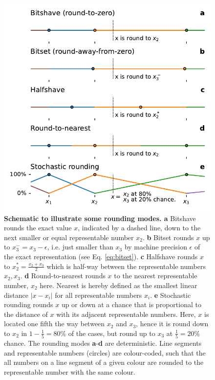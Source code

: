 \begin{figure}[tbhp]
	\includegraphics[width=1\textwidth]{Figures/methods/rounding_modes.pdf}
	\caption{\textbf{Schematic to illustrate some rounding modes. a}
	Bitshave rounds the exact value $x$, indicated by a dashed line, down to the next smaller or equal representable number $x_2$. \textbf{b}
	Bitset rounds $x$ up to $x_3^- = x_3-\epsilon$, i.e. just smaller than $x_3$ by machine precision $\epsilon$ of the exact representation
	(see Eq. \ref{eq:bitset}). \textbf{c} Halfshave rounds $x$ to $x_2^* = \tfrac{x_2 + x_3}{2}$ which is half-way between the representable
	numbers $x_2,x_3$. \textbf{d} Round-to-nearest rounds $x$ to the nearest representable number, $x_2$ here. Nearest is hereby defined
	as the smallest linear distance $\vert x - x_i \vert$ for all representable numbers $x_i$. \textbf{e} Stochastic rounding rounds $x$ up or
	down at a chance that is proportional to the distance of $x$ with its adjacent representable numbers. Here, $x$ is located one fifth the
	way between $x_2$ and $x_3$, hence it is round down to $x_2$ in $1-\tfrac{1}{5} = 80\%$ of the cases, but round up to $x_3$ at
	$\tfrac{1}{5} = 20\%$ chance. The rounding modes \textbf{a}-\textbf{d} are deterministic. Line segments and representable numbers
	(circles) are colour-coded, such that the all numbers on a line segment of a given colour are rounded to the representable number
	with the same colour.}
	\label{fig:methods_rounding_modes}
\end{figure}

